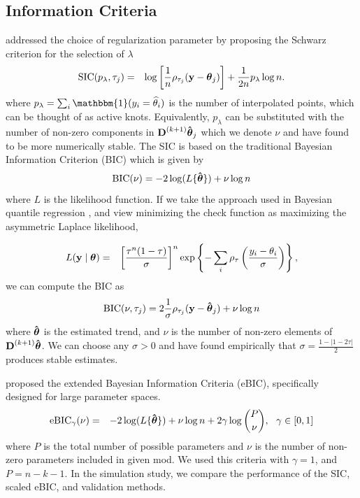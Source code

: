 \documentclass[aoas]{imsart}
\newcommand{\One}{\mathbbm{1}}
\newcommand{\V}[1]{{\bm{\mathbf{\MakeLowercase{#1}}}}} %
\newcommand{\VE}[2]{\MakeLowercase{#1}_{#2}} %
\newcommand{\Vhat}[1]{{\bm{\hat \mathbf{\MakeLowercase{#1}}}}} %
\newcommand{\M}[1]{{\bm{\mathbf{\MakeUppercase{#1}}}}} %
\newcommand{\Mn}[2]{\M{#1}^{(#2)}} %
\begin{document}
\subsection{Information Criteria}
\cite{KoenkerNgPortnoy1994} addressed the choice of regularization parameter by proposing the Schwarz criterion for the selection of $\lambda$
\begin{eqnarray*}
	\label{eq:SIC}
	\mbox{SIC}(p_{\lambda}, \tau_j) & = & \log\left[\frac{1}{n}\rho_{\tau_j}(\V{y} - \V{\theta}_j)\right] + \frac{1}{2n}p_{\lambda}\log n.
\end{eqnarray*}
where $p_{\lambda} = \sum_i \One(\VE{y}{i} = \widehat{\theta}_i)$ is the number of interpolated points, which can be thought of as active knots. Equivalently, $p_{\lambda}$ can be substituted with the number of non-zero components in $\M{D}^{(k+1)}\Vhat{\theta}_j$ which we denote $\nu$ and have found to be more numerically stable.  The SIC is based on the traditional Bayesian Information Criterion (BIC) which is given by
\begin{equation}
\mbox{BIC}(\nu) = -2\log(L\{\Vhat{\theta}\}) + \nu\log n
\end{equation}
where $L$ is the likelihood function. If we take the approach used in Bayesian quantile regression \citep{yu2001bayesian}, and view minimizing the check function as maximizing the asymmetric Laplace likelihood,

\begin{eqnarray*}
	L(\V{y} \mid \V{\theta}) & = & \left[\frac{\tau^n(1-\tau)}{\sigma}\right]^n\exp\left\{-\sum_i\rho_\tau\left(\frac{\VE{y}{i} - \VE{\theta}{i}}{\sigma}\right)\right\},
\end{eqnarray*}
we can compute the BIC as
\begin{eqnarray*}
	\mbox{BIC}(\nu, \tau_j) = 2\frac{1}{\sigma}\rho_{\tau_j}(\V{y}-\Vhat{\theta}_j) + \nu\log n
\end{eqnarray*}
where $\Vhat{\theta}$ is the estimated trend, and $\nu$ is the number of non-zero elements of $\Mn{D}{k+1}\Vhat{\theta}$. We can choose any $\sigma>0$ and have found empirically that $\sigma =  \frac{1-|1-2\tau|}{2}$ produces stable estimates.

\cite{chen2008} proposed the extended Bayesian Information Criteria (eBIC), specifically designed for large parameter spaces.
\begin{eqnarray*}
	\label{eq:eBIC}
	\mbox{eBIC}_{\gamma}(\nu) & = & -2\log(L\{\Vhat{\theta}\}) + \nu\log n  + 2\gamma\log{P \choose \nu},~~\gamma \in [0,1]
\end{eqnarray*}
where $P$ is the total number of possible parameters and $\nu$ is the number of non-zero parameters included in given mod. We used this criteria with $\gamma = 1$, and $P=n-k-1$. In the simulation study, we compare the performance of the SIC, scaled eBIC, and validation methods. 
\end{document}
